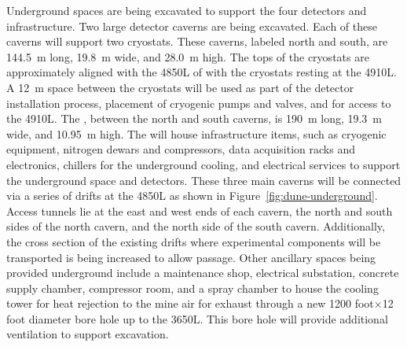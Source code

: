 Underground spaces are being excavated to support the four
 detectors and infrastructure.  Two large detector caverns
are being excavated.  Each of these caverns will support two
\larmass cryostats.  These caverns, labeled north and
south, are \SI{144.5}{\meter} long, \SI{19.8}{\meter} wide,  and 
\SI{28.0}{\meter} high. The tops of the cryostats are approximately
aligned with the 4850L of  with the cryostats resting
at the 4910L.  A \SI{12}{\meter} space between the cryostats will
be used as part of the detector installation process, placement of
cryogenic pumps and valves, and for access to the 4910L.  The
, between the north and south caverns, is \SI{190}{\meter}
long, \SI{19.3}{\meter} wide, and \SI{10.95}{\meter} high.  The
 will house infrastructure items, such as cryogenic
equipment, nitrogen dewars and compressors, data acquisition racks and
electronics, chillers for the underground cooling, and electrical
services to support the underground space and detectors.  These three
main caverns will be connected via a series of drifts at the 4850L as shown in
Figure~\ref{fig:dune-underground}. Access tunnels lie at the east and
west ends of each cavern, the north and south sides of the north cavern, and
the north side of the south cavern. Additionally, the cross section of the
existing drifts where experimental components will be transported is
being increased to allow passage.  Other ancillary spaces being
provided underground include a maintenance shop, electrical
substation, concrete supply chamber, compressor room, and  a spray chamber
to house the cooling tower for heat rejection to the mine air for
exhaust through a new 1200 foot$\times$12 foot diameter bore hole up
to the 3650L.  This bore hole will provide additional ventilation
to support excavation.

